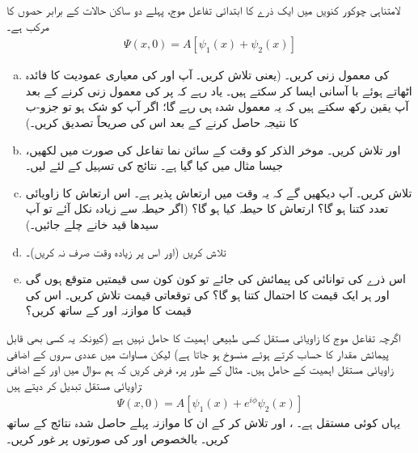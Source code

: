 لامتناہی چوکور کنویں میں ایک ذرے کا ابتدائی تفاعل موج، پہلے دو ساکن حالات کے برابر حصوں کا مرکب ہے۔ 
\begin{align*}
\Psi(x,0) = A[\psi_{1}(x) + \psi_{2}(x)]
\end{align*}
\begin{enumerate}[a.]
\item 
{} کی معمول زنی کریں۔ (یعنی  تلاش کریں۔ آپ  اور  کی معیاری عمودیت کا فائدہ اٹھاتے ہوئے با آسانی ایسا کر سکتے ہیں۔ یاد رہے کہ  پر  کی معمول زنی کرنے کے بعد آپ یقین رکھ سکتے ہیں کہ یہ معمول شدہ ہی رہے گا؛ اگر آپ کو شک ہو تو جزو-ب کا نتیجہ حاصل کرنے کے بعد اس کی صریحاً تصدیق کریں۔) 
\item
{} اور  تلاش کریں۔ موخر الذکر کو وقت کے سائن نما تفاعل کی صورت میں لکھیں، جیسا مثال  میں کیا گیا ہے۔ نتائج کی تسہیل کے لئے  لیں۔ 
\item 
{} تلاش کریں۔ آپ دیکھیں گے کہ یہ وقت میں ارتعاش پذیر ہے۔ اس ارتعاش کا زاویائی تعدد کتنا ہو گا؟ ارتعاش کا حیطہ کیا ہو گا؟ (اگر حیطہ  سے زیادہ نکل آئے تو آپ سیدھا قید خانے چلے جائیں۔) 
\item 
{} تلاش کریں (اور اس پر زیادہ وقت صرف نہ کریں)۔ 
\item
اس ذرے کی توانائی کی پیمائش کی جائے تو کون کون سی قیمتیں متوقع ہوں گی اور ہر ایک قیمت کا احتمال کتنا ہو گا؟  کی توقعاتی قیمت تلاش کریں۔ اس کی قیمت کا موازنہ  اور  کے ساتھ کریں؟
\end{enumerate}
اگرچہ تفاعل موج کا  زاویائی مستقل کسی طبیعی اہمیت کا حامل نہیں ہے (کیونکہ یہ کسی بھی قابل پیمائش مقدار کا حساب کرتے ہوئے منسوخ ہو جاتا ہے) لیکن مساوات  میں عددی سروں کے اضافی زاویائی مستقل اہمیت کے حامل ہیں۔ مثال کے طور پر، فرض کریں کہ ہم سوال  میں  اور  کے اضافی زاویائی مستقل تبدیل کر دیتے ہیں:
\begin{align*}
\Psi (x,0) = A[\psi_{1} (x) + e^{i\phi}\psi_{2}(x)]
\end{align*}
یہاں  کوئی مستقل ہے۔ ،  اور  تلاش کر کے ان کا موازنہ پہلے حاصل شدہ نتائج کے ساتھ کریں۔ بالخصوص  اور  کی صورتوں پر غور کریں۔ 

